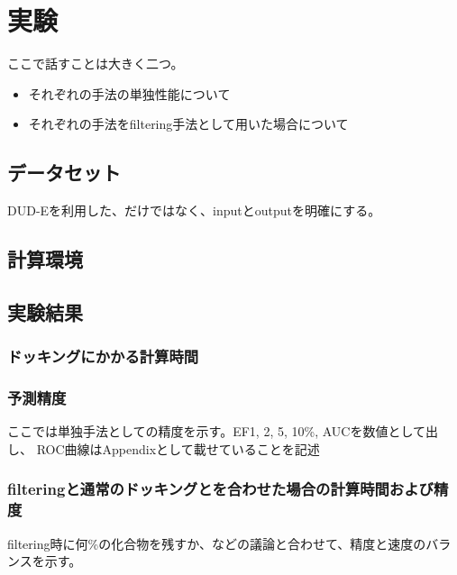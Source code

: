 \chapter{実験}
ここで話すことは大きく二つ。
\begin{itemize}
\item それぞれの手法の単独性能について
\item それぞれの手法をfiltering手法として用いた場合について
\end{itemize}
\section{データセット}
DUD-Eを利用した、だけではなく、inputとoutputを明確にする。
\section{計算環境}
\section{実験結果}
\subsection{ドッキングにかかる計算時間}
\subsection{予測精度}
ここでは単独手法としての精度を示す。EF1, 2, 5, 10\%, AUCを数値として出し、
ROC曲線はAppendixとして載せていることを記述
\subsection{filteringと通常のドッキングとを合わせた場合の計算時間および精度}
filtering時に何\%の化合物を残すか、などの議論と合わせて、精度と速度のバランスを示す。
